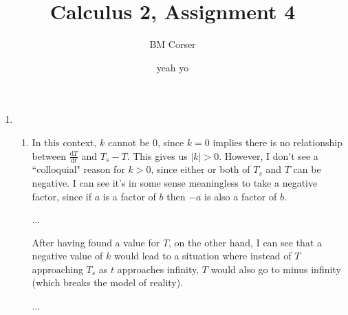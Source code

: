 \documentclass[10pt]{article}
\author{BM Corser}
\title{Calculus 2, Assignment 4}
\date{yeah yo}
\newcommand*{\dTdt}[0]{\frac{\text{d}T}{\text{d}t}}
\begin{document}
    \maketitle 
    \begin{enumerate}
        \item 
        \begin{enumerate}
            \item In this context, $k$ cannot be 0, since $k = 0$ implies there
                is no relationship between $\dTdt$ and $T_s - T$. This gives us
                $|k| > 0$. However, I don't see a ``colloquial" reason for $k >
                0$, since either or both of $T_s$ and $T$ can be negative. I
                can see it's in some sense meaningless to take a negative
                factor, since if $a$ is a factor of $b$ then $-a$ is also a
                factor of $b$.

                ...

                After having found a value for $T$, on the other hand, I can
                see that a negative value of $k$ would lead to a situation
                where instead of $T$ approaching $T_s$ as $t$ approaches
                infinity, $T$ would also go to minus infinity (which breaks the
                model of reality).

                ...


\end{enumerate}
\end{enumerate}
\end{document}
